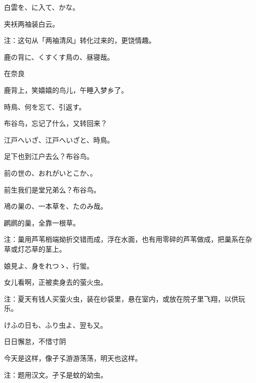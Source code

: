 \begin{haiku}
    {\FH 白雲を、に入て、かな。}

    {\FK 夹袄两袖装白云。}

    {\FT 注：这句从「两袖清风」转化过来的，更饶情趣。}
\end{haiku}

\begin{haiku}
    {\FH 鹿の背に、くすくす鳥の、昼寝哉。}

    {\FK 在奈良}

    {\FK 鹿背上，笑嬉嬉的鸟儿，午睡入梦乡了。}
\end{haiku}

\begin{haiku}
    {\FH 時鳥、何を忘て、引返す。}

    {\FK 布谷鸟，忘记了什么，又转回来？}
\end{haiku}

\begin{haiku}
    {\FH 江戸へいざ、江戸へいざと、時鳥。}

    {\FK 足下也到江户去么？布谷鸟。}
\end{haiku}

\begin{haiku}
    {\FH 前の世の、おれがいとこか、。}

    {\FK 前生我们是堂兄弟么？布谷鸟。}
\end{haiku}

\begin{haiku}
    {\FH 鳰の巣の、一本草を、たのみ哉。}

    {\FK 䴙䴘的巢，全靠一根草。}

    {\FT 注：巢用芦苇梢端拗折交错而成，浮在水面，也有用零碎的芦苇做成，把巢系在杂草或灯芯草的茎上。}
\end{haiku}

\begin{haiku}
    {\FH 娘見よ、身をれつゝ、行蛍。}

    {\FK 女儿看啊，正被卖身去的萤火虫。}

    {\FT 注：夏天有钱人买萤火虫，装在纱袋里，悬在室内，或放在院子里飞翔，以供玩乐。}
\end{haiku}

\begin{haiku}
    {\FH けふの日も、ふり虫よ、翌も又。}

    {\FK 日日懈怠，不惜寸阴}

    {\FK 今天是这样，像孑孓游游荡荡，明天也这样。}

    {\FT 注：题用汉文。孑孓是蚊的幼虫。}
\end{haiku}

